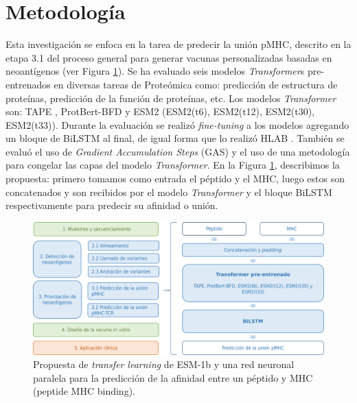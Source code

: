 \section{Metodología}

Esta investigación se  enfoca en la tarea de predecir la unión pMHC, descrito en la etapa 3.1 del proceso general para generar vacunas personalizadas basadas en neoantígenos (ver Figura \ref{fig:proposal}). Se ha evaluado  seis modelos \textit{Transformer}s pre-entrenados en diversas tareas de Proteómica como: predicción de estructura de proteínas, predicción de la función de proteínas, etc. Los modelos \textit{Transformer} son: TAPE \citep{rao2019evaluating}, ProtBert-BFD \citep{elnaggar2021prottrans} y ESM2 \citep{lin2023evolutionary} (ESM2(t6), ESM2(t12), ESM2(t30), ESM2(t33)). Durante la evaluación se realizó \textit{fine-tuning} a los modelos agregando un bloque de BiLSTM al final, de igual forma que lo realizó HLAB \citep{zhang2022hlab}. También se evaluó el uso de \textit{Gradient Accumulation Steps} (GAS) y el uso de una metodología para congelar las capas del modelo \textit{Transformer}. En la Figura \ref{fig:proposal}, describimos la propuesta: primero tomamos como entrada el péptido y el MHC, luego estos son concatenados y son recibidos por el modelo \textit{Transformer} y el bloque BiLSTM respectivamente para predecir su afinidad o unión.




\begin{figure}[H]
	\centering
	\includegraphics[width=\textwidth]{img/proposal/proposal}	
	\caption{Propuesta de \textit{transfer learning} de ESM-1b y una red neuronal paralela para la predicción de la afinidad entre un péptido y MHC (peptide MHC binding).}
	\label{fig:proposal}
\end{figure}


